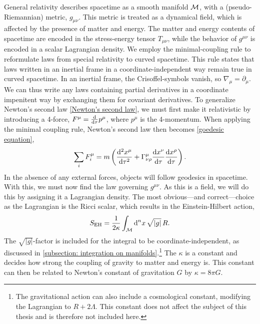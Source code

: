 General relativity describes spacetime as a smooth manifold $\mathcal{M}$, with a (pseudo-Riemannian) metric, $g_{\mu \nu}$.
This metric is treated as a dynamical field, which is affected by the presence of matter and energy.
The matter and energy contents of spacetime are encoded in the stress-energy tensor $T_{\mu \nu}$, while the behavior of $g^{\mu \nu}$ is encoded in a scalar Lagrangian density.
We employ the minimal-coupling rule to reformulate laws from special relativity to curved spacetime.
This rule states that laws written in an inertial frame in a coordinate-independent way remain true in curved spacetime.
In an inertial frame, the Crisoffel-symbols vanish, so $\nabla_\mu = \partial_\mu$.
We can thus write any laws containing partial derivatives in a coordinate impenitent way by exchanging them for covariant derivatives.
To generalize Newton's second law \autoref{Newton's second law}, we must first make it relativistic by introducing a 4-force, $F^\mu = \odv{}{\tau} p^\mu $, where $p^\mu$ is the 4-momentum.
When applying the minimal coupling rule, Newton's second law then becomes \autoref{goedesic equation},~\autocite{hartleGravityIntroductionEinstein2021}
%
\begin{equation}
    \label{covariant version of second law}
    \sum_i F_i^\mu 
    = m \left(
        \odv[2]{x^\mu}{\tau} + \Gamma^\mu_{\nu \rho} \odv{x^\nu}{\tau} \odv{x^\rho}{\tau}
    \right).
\end{equation}
%
In the absence of any external forces, objects will follow geodesics in spacetime.
With this, we must now find the law governing $g^{\mu\nu}$.
As this is a field, we will do this by assigning it a Lagrangian density.
The most obvious---and correct---choice as the Lagrangian is the Ricci scalar, which results in the Einstein-Hilbert action,
%
\begin{equation}
    \label{Einstein-Hilbert action}
    S_{\text{EH}} = \frac{1}{2\kappa}\int_{\mathcal{M}} \text{d}^n x \, \sqrt{|g|}\, R.
\end{equation}
%
The $\sqrt{|g|}$-factor is included for the integral to be coordinate-independent, as discussed in  \autoref{subsection: integration on manifolds}.\footnote{The gravitational action can also include a cosmological constant, modifying the Lagrangian to $R + 2 \Lambda$. This constant does not affect the subject of this thesis and is therefore not included here.}
The $\kappa$ is a constant and decides how strong the coupling of gravity to matter and energy is.
This constant can then be related to Newton's constant of gravitation $G$ by $\kappa = 8 \pi G$.
